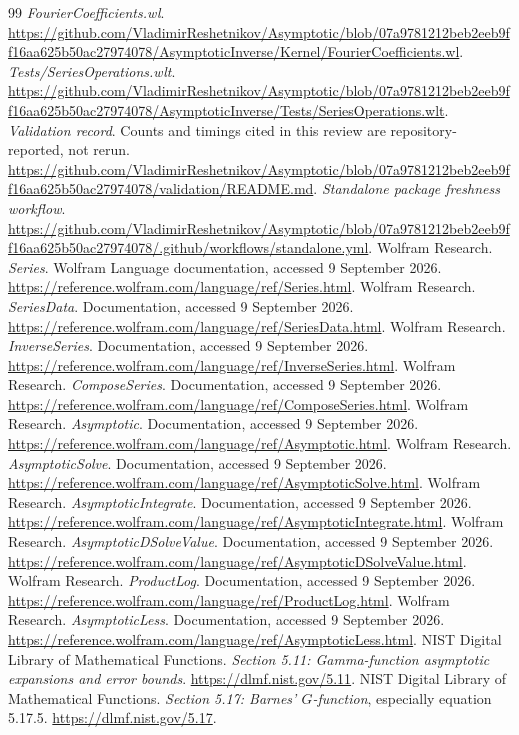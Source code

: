 \documentclass[11pt,letterpaper]{article}
\begin{document}
\begin{thebibliography}{99}
 \emph{FourierCoefficients.wl}. \url{https://github.com/VladimirReshetnikov/Asymptotic/blob/07a9781212beb2eeb9ff16aa625b50ac27974078/AsymptoticInverse/Kernel/FourierCoefficients.wl}.
 \emph{Tests/SeriesOperations.wlt}. \url{https://github.com/VladimirReshetnikov/Asymptotic/blob/07a9781212beb2eeb9ff16aa625b50ac27974078/AsymptoticInverse/Tests/SeriesOperations.wlt}.
 \emph{Validation record}. Counts and timings cited in this review are repository-reported, not rerun. \url{https://github.com/VladimirReshetnikov/Asymptotic/blob/07a9781212beb2eeb9ff16aa625b50ac27974078/validation/README.md}.
 \emph{Standalone package freshness workflow}. \url{https://github.com/VladimirReshetnikov/Asymptotic/blob/07a9781212beb2eeb9ff16aa625b50ac27974078/.github/workflows/standalone.yml}.
 Wolfram Research. \emph{Series}. Wolfram Language documentation, accessed 9 September 2026. \url{https://reference.wolfram.com/language/ref/Series.html}.
 Wolfram Research. \emph{SeriesData}. Documentation, accessed 9 September 2026. \url{https://reference.wolfram.com/language/ref/SeriesData.html}.
 Wolfram Research. \emph{InverseSeries}. Documentation, accessed 9 September 2026. \url{https://reference.wolfram.com/language/ref/InverseSeries.html}.
 Wolfram Research. \emph{ComposeSeries}. Documentation, accessed 9 September 2026. \url{https://reference.wolfram.com/language/ref/ComposeSeries.html}.
 Wolfram Research. \emph{Asymptotic}. Documentation, accessed 9 September 2026. \url{https://reference.wolfram.com/language/ref/Asymptotic.html}.
 Wolfram Research. \emph{AsymptoticSolve}. Documentation, accessed 9 September 2026. \url{https://reference.wolfram.com/language/ref/AsymptoticSolve.html}.
 Wolfram Research. \emph{AsymptoticIntegrate}. Documentation, accessed 9 September 2026. \url{https://reference.wolfram.com/language/ref/AsymptoticIntegrate.html}.
 Wolfram Research. \emph{AsymptoticDSolveValue}. Documentation, accessed 9 September 2026. \url{https://reference.wolfram.com/language/ref/AsymptoticDSolveValue.html}.
 Wolfram Research. \emph{ProductLog}. Documentation, accessed 9 September 2026. \url{https://reference.wolfram.com/language/ref/ProductLog.html}.
 Wolfram Research. \emph{AsymptoticLess}. Documentation, accessed 9 September 2026. \url{https://reference.wolfram.com/language/ref/AsymptoticLess.html}.
 NIST Digital Library of Mathematical Functions. \emph{Section 5.11: Gamma-function asymptotic expansions and error bounds}. \url{https://dlmf.nist.gov/5.11}.
 NIST Digital Library of Mathematical Functions. \emph{Section 5.17: Barnes' $G$-function}, especially equation 5.17.5. \url{https://dlmf.nist.gov/5.17}.
\end{thebibliography}
\end{document}
